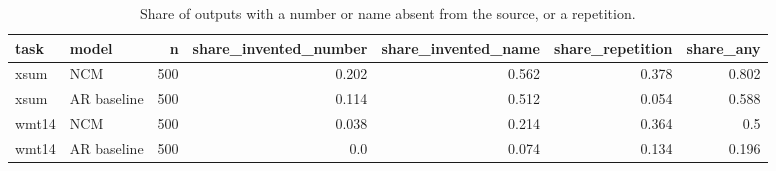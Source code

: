 \begin{table}[t]
\centering\small
\caption{Share of outputs with a number or name absent from the source, or a repetition.}
\label{tab:faithfulness}
\begin{tabular}{llrrrrr}
\toprule
task & model & n & share\_invented\_number & share\_invented\_name & share\_repetition & share\_any \\
\midrule
xsum & NCM & 500 & 0.202 & 0.562 & 0.378 & 0.802 \\
xsum & AR baseline & 500 & 0.114 & 0.512 & 0.054 & 0.588 \\
wmt14 & NCM & 500 & 0.038 & 0.214 & 0.364 & 0.5 \\
wmt14 & AR baseline & 500 & 0.0 & 0.074 & 0.134 & 0.196 \\
\bottomrule
\end{tabular}
\end{table}
